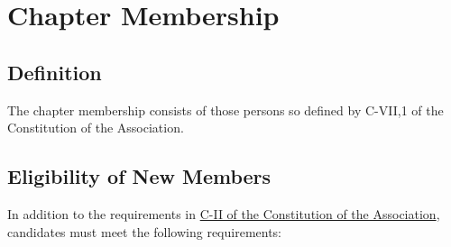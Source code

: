 \chapter{Chapter Membership}
\section{Definition}
The chapter membership consists of those persons so defined by C-VII,1 of the Constitution of the Association.

\section{Eligibility of New Members}\label{by:elig}
In addition to the requirements in \href{http://www.tbp.org/off/ConstBylaw.pdf}{C-II of the Constitution of the Association}, candidates must meet the following requirements:
